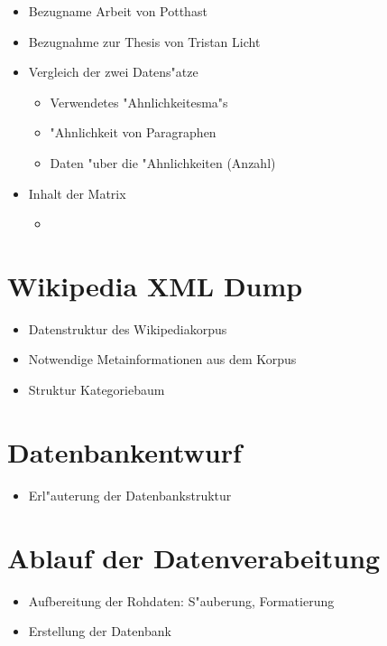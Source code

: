 \begin{itemize}
    \item Bezugname Arbeit von Potthast
    \item Bezugnahme zur Thesis von Tristan Licht
    \item Vergleich der zwei Datens"atze

    \begin{itemize}
      \item Verwendetes "Ahnlichkeitesma"s
      \item "Ahnlichkeit von Paragraphen
      \item Daten "uber die "Ahnlichkeiten (Anzahl)
    \end{itemize}
    \item Inhalt der Matrix
    \begin{itemize}
      \item
    \end{itemize}
\end{itemize}



\section{Wikipedia XML Dump}
\begin{itemize}
    \item Datenstruktur des Wikipediakorpus
    \item Notwendige Metainformationen aus dem Korpus
    \item Struktur Kategoriebaum
\end{itemize}



\section{Datenbankentwurf}
\begin{itemize}
    \item Erl"auterung der Datenbankstruktur
\end{itemize}


\section{Ablauf der Datenverabeitung}
\begin{itemize}
    \item Aufbereitung der Rohdaten: S"auberung, Formatierung
    \item Erstellung der Datenbank
\end{itemize}
